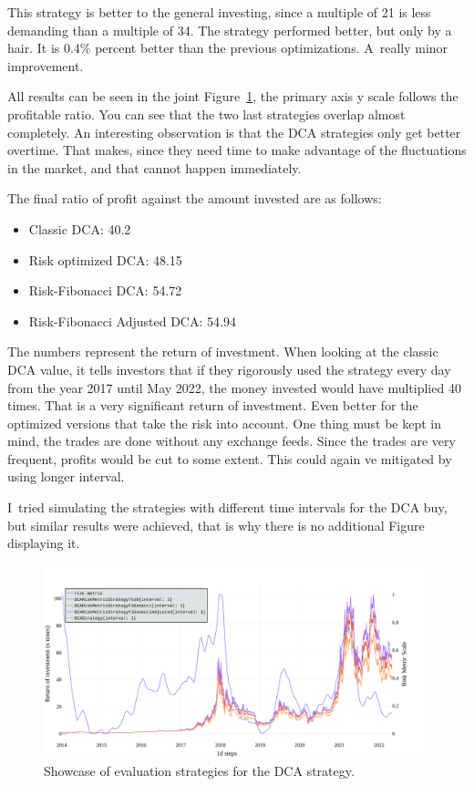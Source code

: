 This strategy is better to the general investing, since a multiple of 21 is less demanding than a multiple of 34. The strategy performed better, but only by a hair. It is 0.4\% percent better than the previous optimizations. A~really minor improvement.

All results can be seen in the joint Figure~\ref{figure-dca-investing}, the primary axis y scale follows the profitable ratio. You can see that the two last strategies overlap almost completely. An interesting observation is that the DCA strategies only get better overtime. That makes, since they need time to make advantage of the fluctuations in the market, and that cannot happen immediately.

The final ratio of profit against the amount invested are as follows:
\begin{itemize}
    \item Classic DCA: 40.2
    \item Risk optimized DCA: 48.15
    \item Risk-Fibonacci DCA: 54.72
    \item Risk-Fibonacci Adjusted DCA: 54.94
\end{itemize}

The numbers represent the return of investment. When looking at the classic DCA value, it tells investors that if they rigorously used the strategy every day from the year 2017 until May 2022, the money invested would have multiplied 40 times. That is a very significant return of investment. Even better for the optimized versions that take the risk into account. One thing must be kept in mind, the trades are done without any exchange feeds. Since the trades are very frequent, profits would be cut to some extent. This could again ve mitigated by using longer interval.

I~tried simulating the strategies with different time intervals for the DCA buy, but similar results were achieved, that is why there is no additional Figure displaying it.

\begin{figure}[!t]
    \centering
    \includegraphics[width=\columnwidth]{figures/combined-dca-investing.pdf}
    \caption{Showcase of evaluation strategies for the DCA strategy.}
    \label{figure-dca-investing}
\end{figure}


